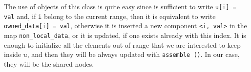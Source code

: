 The use of objects of this class is quite easy since is sufficient to write \texttt{u[i] = val} and, if  \texttt{i} belong to the current range, then it is equivalent to write \texttt{owned\_data[i] = val}, otherwise it is inserted a new component \texttt{<i, val>} in the map \texttt{non\_local\_data}, or it is updated, if one exists already with this index. It is enough to initialize all the elements out-of-range that we are interested to keep inside $ u $, and then they will be always updated with \texttt{assemble ()}. In our case, they will be the shared nodes.\\
